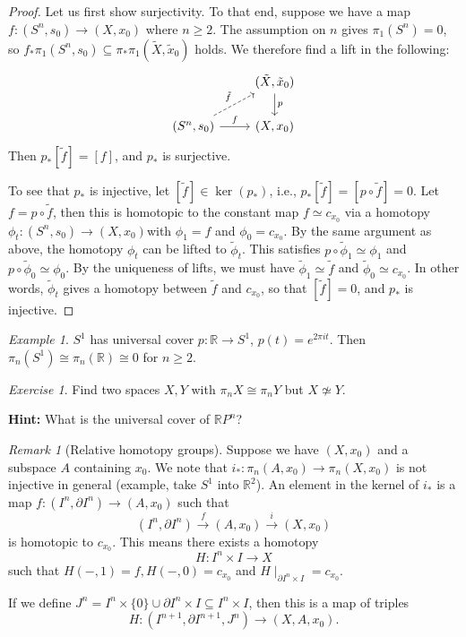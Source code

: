 \documentclass[a4paper]{tufte-book}
\theoremstyle{remark}
\newtheorem{Ex}[equation]{Exercise}
\newtheorem{Exa}[equation]{Example}
\newtheorem{Rem}[equation]{Remark}
\begin{document}
\begin{proof}
Let us first show surjectivity. To that end, suppose we have a map $f \colon (S^n,s_0) \to (X,x_0)$ where $n \ge 2$. The assumption on  $n$ gives $\pi_1(S^n) = 0$, so $f_*\pi_1(S^n,s_0) \subseteq \pi_*\pi_1(\tilde X,\tilde x_0)$ holds. We therefore find a lift in the following:
\[\begin{tikzcd}
	& {(\tilde X,\tilde x_0)} \\
	{(S^n,s_0)} & {(X,x_0)}
	\arrow["f", from=2-1, to=2-2]
	\arrow["p", from=1-2, to=2-2]
	\arrow["{\tilde f}", dashed, from=2-1, to=1-2]
\end{tikzcd}\]
Then $p_*[\tilde f] = [f]$, and $p_*$ is surjective. 

To see that $p_*$ is injective, let $[\tilde f] \in \ker(p_*)$, i.e., $p_*[\tilde f] = [p \circ \tilde f] = 0$. Let $f = p \circ \tilde f$, then this is homotopic to the constant map $f \simeq c_{x_0}$ via a homotopy $\phi_t \colon (S^n,s_0) \to (X,x_0)$with $\phi_1 =f $ and $\phi_0 = c_{x_0}$. By the same argument as above, the homotopy $\phi_t$ can be lifted to $\tilde \phi_t$. This satisfies $p \circ \tilde \phi_1 \simeq \phi_1 $ and $p \circ \tilde \phi_0 \simeq \phi_0$. By the uniqueness of lifts, we must have $\tilde \phi_1 \simeq \tilde f$ and $\tilde \phi_0 \simeq c_{x_0}$. In other words, $\tilde \phi_t$ gives a homotopy between $\tilde f$ and $c_{x_0}$, so that $[\tilde f]  = 0$, and $p_*$ is injective. 
\end{proof}
\begin{Exa}
	$S^1$ has universal cover $p \colon \mathbb{R} \to S^1$, $p(t) = e^{2\pi i t}$. Then $\pi_n(S^1) \cong \pi_n(\mathbb{R}) \cong 0$ for $n \ge 2$. 
\end{Exa}
\begin{Ex}
	Find two spaces $X,Y$ with $\pi_nX \cong \pi_nY$ but $X \not \simeq Y$. 

	\textbf{Hint: } What is the universal cover of $\mathbb{R}P^n$?
\end{Ex}
\begin{Rem}[Relative homotopy groups]
	Suppose we have $(X,x_0)$ and a subspace $A$ containing $x_0$. We note that $i_* \colon \pi_n(A,x_0) \to \pi_n(X,x_0)$ is not injective in general (example, take $S^1$ into $\mathbb{R}^2$). An element in the kernel of $i_*$ is a map $f \colon (I^n,\partial I^n) \to (A,x_0)$ such that 
	\[
(I^n,\partial I^n) \xrightarrow{f} (A,x_0) \xrightarrow{i} (X,x_0)
	\] 
	is homotopic to $c_{x_0}$. This means there exists a homotopy
	\[
H \colon I^n \times I \to X
	\]
	such that $H(-,1) = f, H(-,0) = c_{x_0}$ and $H \mid_{\partial I^n \times I} = c_{x_0}$. 

	If we define $J^n = I^n \times \{ 0 \} \cup \partial I^n \times I \subseteq I^n \times I$, then this is a map of triples
	\[
H \colon (I^{n+1},\partial I^{n+1},J^n) \to (X,A,x_0). 
	\] 
\end{Rem}
\end{document}
